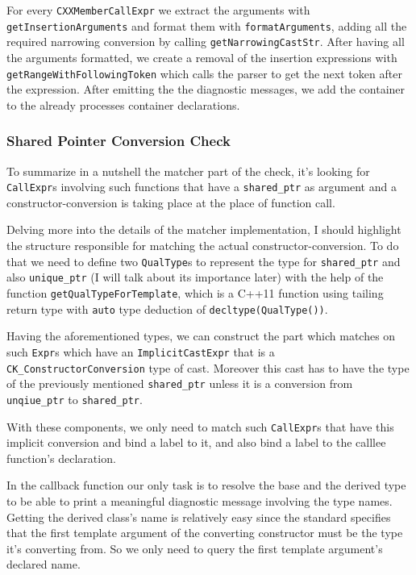 \par For every \verb|CXXMemberCallExpr| we extract the arguments with \verb|getInsertionArguments| and format them with \verb|formatArguments|, adding all the required narrowing conversion by calling \verb|getNarrowingCastStr|. After having all the arguments formatted, we create a removal of the insertion expressions with \verb|getRangeWithFollowingToken| which calls the parser to get the next token after the expression. After emitting the the diagnostic messages, we add the container to the already processes container declarations.
\subsubsection{Shared Pointer Conversion Check}
\par To summarize in a nutshell the matcher part of the check, it's looking for \verb|CallExpr|s involving such functions that have a \verb|shared_ptr| as argument and a constructor-conversion is taking place at the place of function call. \medskip
\par Delving more into the details of the matcher implementation, I should highlight the structure responsible for matching the actual constructor-conversion. To do that we need to define two \verb|QualType|s to represent the type for \verb|shared_ptr| and also \verb|unique_ptr| (I will talk about its importance later) with the help of the function \verb|getQualTypeForTemplate|, which is a C++11 function using tailing return type with \verb|auto| type deduction of \verb|decltype(QualType())|. \medskip
\par Having the aforementioned types, we can construct the part which matches on such \verb|Expr|s which have an \verb|ImplicitCastExpr| that is a \verb|CK_ConstructorConversion| type of cast. Moreover this cast has to have the type of the previously mentioned \verb|shared_ptr| unless it is a conversion from \verb|unqiue_ptr| to \verb|shared_ptr|. \medskip
\par With these components, we only need to match such \verb|CallExpr|s that have this implicit conversion and bind a label to it, and also bind a label to the calllee function's declaration. \medskip
\par In the callback function our only task is to resolve the base and the derived type to be able to print a meaningful diagnostic message involving the type names. Getting the derived class's name is relatively easy since the standard specifies\cite[\S20.8.2.2.1]{cpp_standard} that the first template argument of the converting constructor must be the type it's converting from. So we only need to query the first template argument's declared name. \medskip
